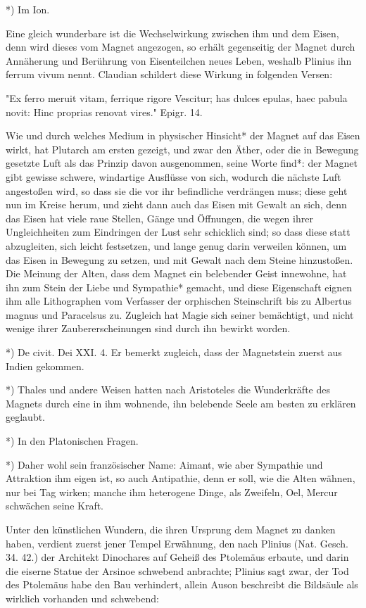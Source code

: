 \documentclass[a4paper, 11pt, oneside, polutonikogreek, german]{article}
\begin{document}
*) Im Ion.

Eine gleich wunderbare ist die Wechselwirkung zwischen ihm und dem Eisen, denn wird dieses vom Magnet angezogen, so erhält gegenseitig der Magnet durch Annäherung und Berührung von Eisenteilchen neues Leben, weshalb Plinius ihn ferrum vivum nennt. Claudian schildert diese Wirkung in folgenden Versen:

"Ex ferro meruit vitam, ferrique rigore
Vescitur; has dulces epulas, haec pabula
novit: Hinc proprias renovat vires." Epigr. 14.

Wie und durch welches Medium in physischer Hinsicht* der Magnet auf das Eisen wirkt, hat Plutarch am ersten gezeigt, und zwar den Äther, oder die in Bewegung gesetzte Luft als das Prinzip davon ausgenommen, seine Worte find*: der Magnet gibt gewisse schwere, windartige Ausflüsse von sich, wodurch die nächste Luft angestoßen wird, so dass sie die vor ihr befindliche verdrängen muss; diese geht nun im Kreise herum, und zieht dann auch das Eisen mit Gewalt an sich, denn das Eisen hat viele raue Stellen, Gänge und Öffnungen, die wegen ihrer Ungleichheiten zum Eindringen der Lust sehr schicklich sind; so dass diese statt abzugleiten, sich leicht festsetzen, und lange genug darin verweilen können, um das Eisen in Bewegung zu setzen, und mit Gewalt nach dem Steine hinzustoßen. Die Meinung der Alten, dass dem Magnet ein belebender Geist innewohne, hat ihn zum Stein der Liebe und Sympathie* gemacht, und diese Eigenschaft eignen ihm alle Lithographen vom Verfasser der orphischen Steinschrift bis zu Albertus magnus und Paracelsus zu. Zugleich hat Magie sich seiner bemächtigt, und nicht wenige ihrer Zaubererscheinungen sind durch ihn bewirkt worden.

*) De civit. Dei XXI. 4. Er bemerkt zugleich, dass der Magnetstein zuerst aus Indien gekommen.

*) Thales und andere Weisen hatten nach Aristoteles die Wunderkräfte des Magnets durch eine in ihm wohnende, ihn belebende Seele am besten zu erklären geglaubt.

*) In den Platonischen Fragen.

*) Daher wohl sein französischer Name: Aimant, wie aber Sympathie und Attraktion ihm eigen ist, so auch Antipathie, denn er soll, wie die Alten wähnen, nur bei Tag wirken; manche ihm heterogene Dinge, als Zweifeln, Oel, Mercur schwächen seine Kraft.

Unter den künstlichen Wundern, die ihren Ursprung dem Magnet zu danken haben, verdient zuerst jener Tempel Erwähnung, den nach Plinius (Nat. Gesch. 34. 42.) der Architekt Dinochares auf Geheiß des Ptolemäus erbaute, und darin die eiserne Statue der Arsinoe schwebend anbrachte; Plinius sagt zwar, der Tod des Ptolemäus habe den Bau verhindert, allein Auson beschreibt die Bildsäule als wirklich vorhanden und schwebend:
\end{document}
